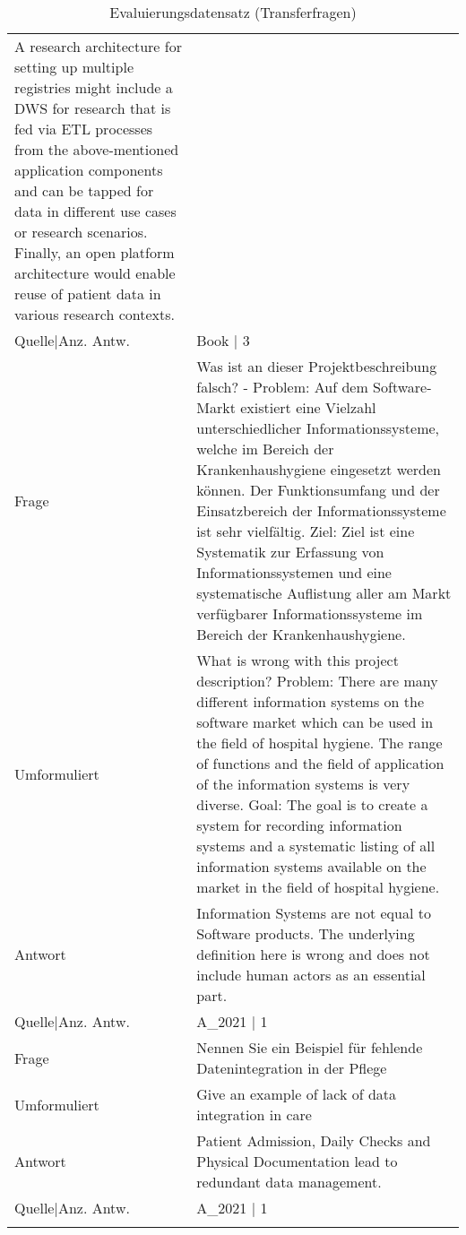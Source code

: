 {\begin{landscape}
\begin{longtable}{p{3cm}p{}}
    A research architecture for setting up multiple registries might include a DWS for research that is fed via ETL processes from the above-mentioned application components and can be tapped for data in different use cases or research scenarios.
    Finally, an open platform architecture would enable reuse of patient data in various research contexts.\\
    Quelle|Anz. Antw. &  Book  | 3 \\
    \midrule
    Frage & Was ist an dieser Projektbeschreibung falsch?
                - Problem: Auf dem Software-Markt existiert eine Vielzahl unterschiedlicher Informationssysteme, welche im Bereich der Krankenhaushygiene eingesetzt werden können.
    Der Funktionsumfang und der Einsatzbereich der Informationssysteme ist sehr vielfältig.
                Ziel: Ziel ist eine Systematik zur Erfassung von Informationssystemen und eine systematische Auflistung aller am Markt verfügbarer Informationssysteme im Bereich der Krankenhaushygiene.\\
    Umformuliert & What is wrong with this project description?
    Problem: There are many different information systems on the software market which can be used in the field of hospital hygiene.
    The range of functions and the field of application of the information systems is very diverse.
    Goal: The goal is to create a system for recording information systems and a systematic listing of all information systems available on the market in the field of hospital hygiene.\\
    Antwort & Information Systems are not equal to Software products.
    The underlying definition here is wrong and does not include human actors as an essential part.\\
    Quelle|Anz. Antw. &  A\_2021  | 1 \\
    \midrule
    Frage & Nennen Sie ein Beispiel für fehlende Datenintegration in der Pflege \\
    Umformuliert & Give an example of lack of data integration in care \\
    Antwort & Patient Admission, Daily Checks and Physical Documentation lead to redundant data management.\\
    Quelle|Anz. Antw. &  A\_2021  | 1 \\
    \bottomrule
    \caption*{Evaluierungsdatensatz (Transferfragen)}\label{tab:evaldata-transfer}
\end{longtable}
\end{landscape} \par}